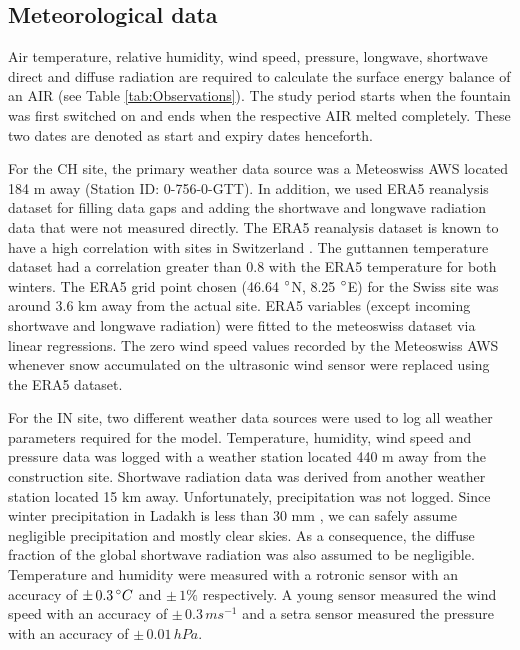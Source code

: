 \documentclass[utf8]{frontiersSCNS}
\begin{document}
\subsection{Meteorological data}

Air temperature, relative humidity, wind speed, pressure, longwave, shortwave direct and diffuse radiation are
required to calculate the surface energy balance of an AIR (see Table \ref{tab:Observations}). The study period
starts when the fountain was first switched on and ends when the respective AIR melted completely. These two
dates are denoted as start and expiry dates henceforth.

For the CH site, the primary weather data source was a Meteoswiss AWS located 184 m away (Station ID: 0-756-0-GTT).
In addition, we used ERA5 reanalysis dataset \citep{era5} for filling data gaps and adding the shortwave and
longwave radiation data that were not measured directly. The ERA5 reanalysis dataset is known to have a high
correlation with sites in Switzerland \citep{Scherrer_2020}. The guttannen temperature dataset had a correlation
greater than 0.8 with the ERA5 temperature for both winters.  The ERA5 grid point chosen (46.64 $\degree$N,
8.25 $\degree$E) for the Swiss site was around 3.6 km away from the actual site. ERA5 variables (except incoming
shortwave and longwave radiation) were fitted to the meteoswiss dataset via linear regressions. The zero wind
speed values recorded by the Meteoswiss AWS whenever snow accumulated on the ultrasonic wind sensor were
replaced using the ERA5 dataset. 

For the IN site, two different weather data sources were used to log all weather parameters required for the
model. Temperature, humidity, wind speed and pressure data was logged with a weather station located 440 m away
from the construction site. Shortwave radiation data was derived from another weather station located 15 km
away. Unfortunately, precipitation was not logged. Since winter precipitation in Ladakh is less than 30 mm
\citep{Nusser_2012}, we can safely assume negligible precipitation and mostly clear skies. As a consequence, the
diffuse fraction of the global shortwave radiation was also assumed to be negligible. Temperature and humidity
were measured with a rotronic sensor with an accuracy of $\pm\,0.3\, \degree C$ and $\pm\,1 \%$ respectively. A
young sensor measured the wind speed with an accuracy of $\pm\,0.3\, ms^{-1}$ and a setra sensor measured the
pressure with an accuracy of $\pm\,0.01\, hPa$. 
\end{document}
